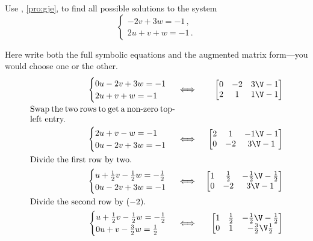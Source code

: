 \begin{example} \label{eg:gjeb}
Use , \autoref{pro:gje}, to find all possible solutions to the  system
\begin{equation*}
\begin{cases}
-2v+3w=-1\,,\\2u+v+w=-1\,.
\end{cases}
\end{equation*}

\begin{solution} 
Here write both the full symbolic equations and the augmented matrix form---you would choose one or the other.
\begin{eqnarray*}
\begin{cases}
0u-2v+3w=-1\\2u+v+w=-1
\end{cases}
&\iff&%
\begin{bmatrix} 0&-2&3\V-1\\2&1&1\V-1 \end{bmatrix}
\\
\parbox{0.5\linewidth}{Swap the two rows to get a non-zero top-left entry.}
\\
\begin{cases}
2u+v-w=-1\\0u-2v+3w=-1
\end{cases}
&\iff&%
\begin{bmatrix} 2&1&-1\V-1\\0&-2&3\V-1 \end{bmatrix}
\\
\parbox{0.5\linewidth}{Divide the first row by two.}
\\
\begin{cases}
u+\frac12v-\frac12w=-\frac12\\0u-2v+3w=-1
\end{cases}
&\iff&%
\begin{bmatrix} 1&\frac12&-\frac12\V-\frac12\\0&-2&3\V-1 \end{bmatrix}
\\
\parbox{0.5\linewidth}{Divide the second row by~\((-2)\).}
\\
\begin{cases}
u+\frac12v-\frac12w=-\frac12\\0u+v-\frac32w=\frac12
\end{cases}
&\iff&%
\begin{bmatrix} 1&\frac12&-\frac12\V-\frac12\\0&1&-\frac32\V\frac12 \end{bmatrix}

\end{eqnarray*}
\end{solution}
\end{example}
